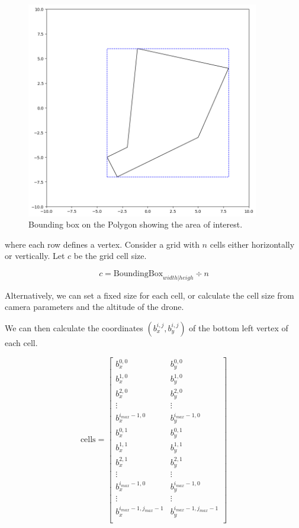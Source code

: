 \begin{figure} \label{fig:pegasus-planner-generate-grid-bounding-box}
  \centering
  \includegraphics[width=4in]{figures/methodology/pegasus_planner/generate_grid/bounding-box}
  \caption[Bounding Box on the Polygon Showing the Area of Interest]{\small Bounding box on the Polygon showing the area of interest.}
\end{figure}

where each row defines a vertex. Consider a grid with $n$ cells either horizontally or vertically. Let $c$ be the grid cell size.

$$c = \text{BoundingBox}_{width|heigh} \div  n $$

Alternatively, we can set a fixed size for each cell, or calculate the cell size from camera parameters and the altitude of the drone.

We can then calculate the coordinates $(b^{i,j}_x, b^{i,j}_y)$ of the bottom left vertex of each cell.

$$\text{cells} =\begin{bmatrix}
  b^{0,0}_x & b^{0,0}_y \\
  b^{1,0}_x & b^{1,0}_y \\
  b^{2,0}_x & b^{2,0}_y \\
  \vdots & \vdots \\
  b^{i_{max} - 1,0}_x & b^{i_{max} - 1,0}_y \\
  b^{0,1}_x & b^{0,1}_y \\
  b^{1,1}_x & b^{1,1}_y \\
  b^{2,1}_x & b^{2,1}_y \\
  \vdots & \vdots \\
  b^{i_{max} - 1,0}_x & b^{i_{max} - 1,0}_y \\
  \vdots & \vdots \\
  b^{i_{max} - 1,j_{max}-1}_x & b^{i_{max} - 1,j_{max} - 1}_y \\
\end{bmatrix}$$

